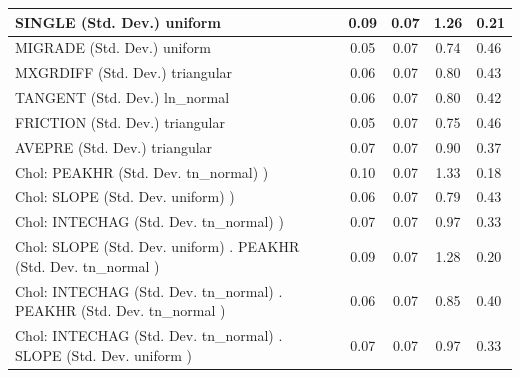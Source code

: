 \begin{table}
\begin{center}
\begin{tabular}{|l|l|c|c|c|l|}
			\hline
			SINGLE (Std. Dev.) uniform &  & 0.09 & 0.07 & 1.26 & 0.21 \\
			\hline
			MIGRADE (Std. Dev.) uniform &  & 0.05 & 0.07 & 0.74 & 0.46 \\
			\hline
			MXGRDIFF (Std. Dev.) triangular &  & 0.06 & 0.07 & 0.80 & 0.43 \\
			\hline
			TANGENT (Std. Dev.) ln_normal &  & 0.06 & 0.07 & 0.80 & 0.42 \\
			\hline
			FRICTION (Std. Dev.) triangular &  & 0.05 & 0.07 & 0.75 & 0.46 \\
			\hline
			AVEPRE (Std. Dev.) triangular &  & 0.07 & 0.07 & 0.90 & 0.37 \\
			\hline
			 Chol: PEAKHR (Std. Dev. tn_normal) ) &  & 0.10 & 0.07 & 1.33 & 0.18 \\
			\hline
			 Chol: SLOPE (Std. Dev. uniform) ) &  & 0.06 & 0.07 & 0.79 & 0.43 \\
			\hline
			 Chol: INTECHAG (Std. Dev. tn_normal) ) &  & 0.07 & 0.07 & 0.97 & 0.33 \\
			\hline
			 Chol: SLOPE (Std. Dev. uniform) . PEAKHR (Std. Dev.   tn_normal ) &  & 0.09 & 0.07 & 1.28 & 0.20 \\
			\hline
			 Chol: INTECHAG (Std. Dev. tn_normal) . PEAKHR (Std. Dev.   tn_normal ) &  & 0.06 & 0.07 & 0.85 & 0.40 \\
			\hline
			 Chol: INTECHAG (Std. Dev. tn_normal) . SLOPE (Std. Dev.   uniform ) &  & 0.07 & 0.07 & 0.97 & 0.33 \\
			\hline
		\end{tabular}
	\end{center}
\end{table}